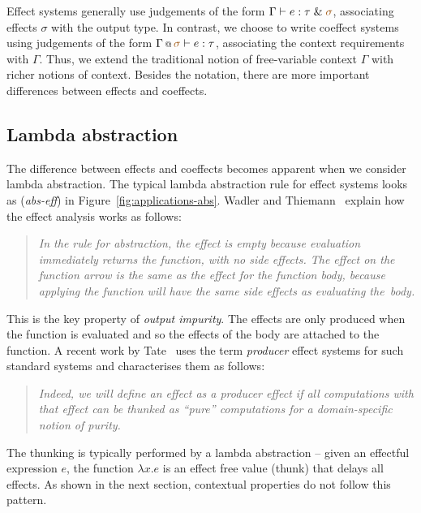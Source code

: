 Effect systems generally use judgements of the form $\Gamma \vdash e : \tau \;\&\; \aclrd{\sigma}$, 
associating effects $\sigma$ with the output type. In contrast, we choose to write coeffect 
systems using judgements of the form $\coctx{\Gamma}{\aclrd{\sigma}} \vdash e : \tau$, associating
the context requirements with $\Gamma$. Thus, we extend the traditional notion of free-variable
context $\Gamma$ with richer notions of context. Besides the notation, there are more important 
differences between effects and coeffects.


\subsection{Lambda abstraction}
\label{sec:applications-structure-lam}

The difference between effects and coeffects becomes apparent when we consider lambda abstraction.
The typical lambda abstraction rule for effect systems looks as (\emph{abs-eff}) in 
Figure~\ref{fig:applications-abs}. Wadler and Thiemann~\cite{monads-effects-marriage} explain how 
the effect analysis works as follows:
%
\begin{quote}
\emph{In the rule for abstraction, the effect is empty because evaluation immediately
returns the function, with no side effects. The effect on the function arrow
is the same as the effect for the function body, because applying the function will
have the same side effects as evaluating the~body.}
\end{quote}
%
This is the key property of \emph{output impurity}. The effects are only produced when the
function is evaluated and so the effects of the body are attached to the function. A recent
work by Tate~\cite{effects-producer-semantics} uses the term \emph{producer} effect systems
for such standard systems and characterises them as follows:
%
\begin{quote}
\emph{Indeed, we will define an effect as a producer effect if all computations with that 
effect can be thunked as ``pure'' computations for a domain-specific notion of purity.}
\end{quote} 
%
The thunking is typically performed by a lambda abstraction -- given an effectful expression 
$e$, the function $\lambda x.e$ is an effect free value (thunk) that delays all effects.
As shown in the next section, contextual properties do not follow this pattern.

